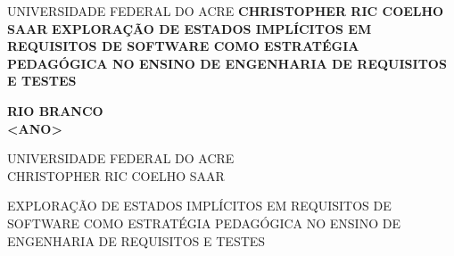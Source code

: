 \documentclass[ruledheader]{abnt_UFF}[abntex2]
\newcommand{\meunome}{CHRISTOPHER RIC COELHO SAAR}
\newcommand{\meutitulo}{EXPLORAÇÃO DE ESTADOS IMPLÍCITOS EM REQUISITOS DE SOFTWARE COMO ESTRATÉGIA PEDAGÓGICA NO ENSINO DE ENGENHARIA DE REQUISITOS E TESTES}
\newcommand{\meuano}{<ANO>}
\begin{document}
    \renewcommand{\listfigurename}{Lista de Figuras}
    \renewcommand{\figurename}{Figura}
    \renewcommand{\listtablename}{Lista de Tabelas}
    \renewcommand{\tablename}{Tabela}
    \renewcommand{\contentsname}{Sumário}
    \renewcommand{\refname}{Referências}
    \renewcommand{\appendixname}{Apêndices}
    \renewcommand{\chaptername}{Capítulo}

	\cleardoublepage
	\thispagestyle{empty}
	
	\vspace{-60mm}
	  \begin{singlespace}
	    \begin{center}
	      {\large UNIVERSIDADE FEDERAL DO ACRE}
	      \vskip4.0cm{\textbf{\Large \meunome}}
	      \vskip5.0cm {\textbf{\meutitulo}}
	    \end{center}
	    \begin{center}
	      \vskip10.0cm{\textbf{RIO BRANCO\\\meuano}}
	    \end{center}
	  \end{singlespace}
	\cleardoublepage
	\thispagestyle{empty}
	
	\vspace{-60mm}
	  \begin{center}
	    {\large UNIVERSIDADE FEDERAL DO ACRE}\\
	    \vspace{3cm}
	    {\large \meunome} \\
	    \vspace{3cm}
	    
	    {\large \meutitulo} \\
	    \vspace{1.5cm}
	  \end{center}
	
\end{document}
